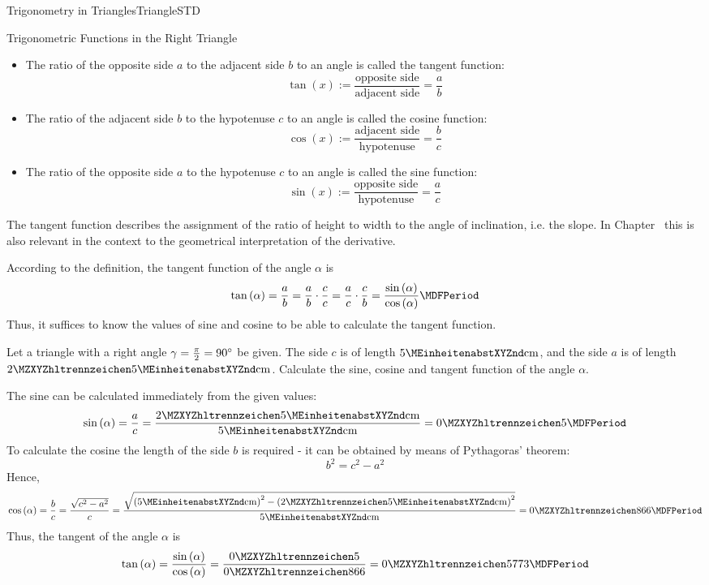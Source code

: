 \begin{MXContent}{Trigonometry in Triangles}{Triangle}{STD}
\begin{MXInfo}{Trigonometric Functions in the Right Triangle}
\begin{itemize}
\item
The ratio of the opposite side $a$ to the adjacent side $b$ to an angle 
is called the tangent function:
\[
\tan(x) := \frac{\text{opposite side}}{\text{adjacent side}} = \frac{a}{b} %
\]
%
\item
The ratio of the adjacent side $b$ to the hypotenuse $c$ to an angle 
is called the cosine function:
\[
\cos(x) := \frac{\text{adjacent side}}{\text{hypotenuse}} = \frac{b}{c} %
\]
%
\item
The ratio of the opposite side $a$ to the hypotenuse $c$ 
to an angle is called the sine function:
\[
\sin(x) := \frac{\text{opposite side}}{\text{hypotenuse}} = \frac{a}{c} %
\]
\end{itemize}
\end{MXInfo}

The tangent function describes the assignment of the ratio 
of height to width to the angle of inclination, i.e. the slope. In 
Chapter~ this is also relevant in the context to the 
geometrical interpretation of the derivative.

According to the definition, the tangent function of the angle 
$\alpha$ is
\[
\tan\left(\alpha\right)=\frac{a}{b}=\frac{a}{b}\cdot\frac{c}{c} %
 =\frac{a}{c}\cdot\frac{c}{b} %
 =\frac{\sin\left(\alpha\right)}{\cos\left(\alpha\right)} \MDFPeriod %
\]
Thus, it suffices to know the values of sine and cosine   
to be able to calculate the tangent function.

\begin{MExample}
Let a triangle with a right angle $\gamma=\frac{\pi}{2}=90^{\circ}$ be given.
The side $c$ is of length $5\MEinheit{cm}$, and the side $a$ is of length 
$\MZahl{2}{5}\MEinheit{cm}$. Calculate the sine, cosine and tangent function 
of the angle $\alpha$.

The sine can be calculated immediately from the given values:
\[
\sin\left(\alpha\right)=\frac{a}{c}
 =\frac{\MZahl{2}{5}\MEinheit{cm}}{5\MEinheit{cm}}=\MZahl{0}{5} \MDFPeriod\]
To calculate the cosine the length of the side $b$ is required - it can be obtained
by means of Pythagoras' theorem:
\[
b^2 = c^2 - a^2 %
\]
Hence,
\[
\cos\left(\alpha\right)=\frac{b}{c}=\frac{\sqrt{c^2-a^2}}{c} %
 =\frac{\sqrt{\left(5\MEinheit{cm}\right)^2 - \left(\MZahl{2}{5}\MEinheit{cm}\right)^2}}{5\MEinheit{cm}}=\MZahl{0}{866} \MDFPeriod %
\]
Thus, the tangent of the angle $\alpha$ is 
\[
\tan\left(\alpha\right) %
 =\frac{\sin\left(\alpha\right)}{\cos\left(\alpha\right)} %
 =\frac{\MZahl{0}{5}}{\MZahl{0}{866}}=\MZahl{0}{5773} \MDFPeriod
\]
\end{MExample}



\end{MXContent}
